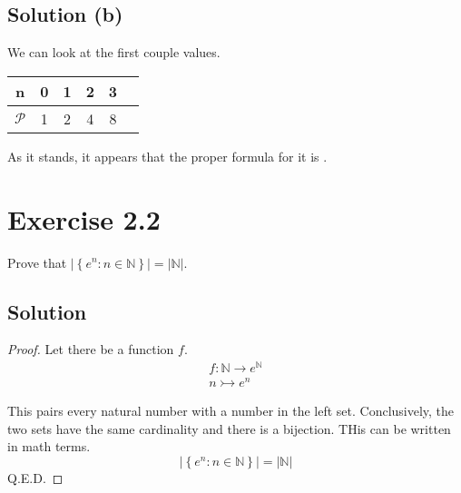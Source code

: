 \documentclass[12pt]{report}
\begin{document}
\subsection{Solution (b)}
We can look at the first couple values.
\begin{center}
    \begin{tabular}{|c|c|c|c|c|c}
        \hline
        n & 0 & 1 & 2 & 3 \\
        \hline
        $\mathcal{P}$ & 1 & 2 & 4 & 8 \\
        \hline
    \end{tabular}
\end{center}

As it stands, it appears that the proper formula for it is . 

\pagebreak
\section{Exercise 2.2}
Prove that $\left|\left\{ e^n : n \in \mathbb{N} \right\}\right| = \left| \mathbb{N} \right|$.

\subsection*{Solution}
\begin{proof}
    Let there be a function $f$.
    \begin{gather}
        f: \mathbb{N} \rightarrow e^\mathbb{N}\\
        n \rightarrowtail e^n
    \end{gather}
    
    This pairs every natural number with a number in the left set.
    Conclusively, the two sets have the same cardinality and there is a bijection.
    THis can be written in math terms.
    \begin{equation}
        \left|\left\{ e^n : n \in \mathbb{N} \right\}\right| = \left| \mathbb{N} \right|
    \end{equation}
    Q.E.D.
\end{proof}

\pagebreak
\end{document}
